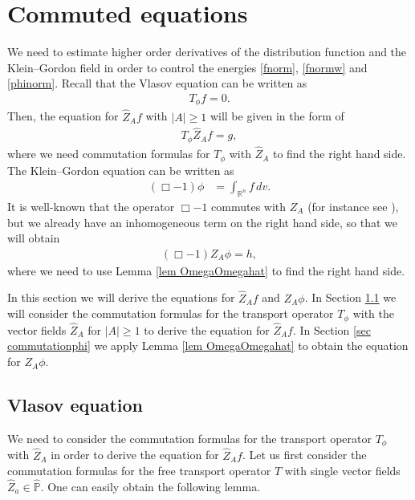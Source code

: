 \documentclass{article}
\newcommand{\bbr}{{\mathbb R}}
\newcommand{\bbp}{{\mathbb P}}
\newcommand{\bbrn}{{\bbr^n}}
\begin{document}
%
\section{Commuted equations} \label{sec commutation}
We need to estimate higher order derivatives of the distribution function and the Klein--Gordon field in order to control the energies \eqref{fnorm}, \eqref{fnormw} and \eqref{phinorm}. Recall that the Vlasov equation can be written as
\begin{align*}
T_\phi f = 0 .
\end{align*}
Then, the equation for $ \hat{ Z }_A f $ with $ | A | \geq 1 $ will be given in the form of
\begin{align*}
T_\phi \hat{ Z }_A f = g ,
\end{align*}
where we need commutation formulas for $ T_\phi $ with $ \hat{ Z }_A $ to find the right hand side. The Klein--Gordon equation can be written as
\begin{align*}
( \Box - 1 ) \phi & = \int_\bbrn f \, d v .
\end{align*}
It is well-known that the operator $ \Box - 1 $ commutes with $ Z_A $ (for instance see \cite{K85, K93}), but we already have an inhomogeneous term on the right hand side, so that we will obtain
\begin{align*}
( \Box - 1 ) Z_A \phi = h ,
\end{align*}
where we need to use Lemma \ref{lem OmegaOmegahat} to find the right hand side.

In this section we will derive the equations for $ \hat{ Z }_A f $ and $ Z_A \phi $. In Section \ref{sec commutationf} we will consider the commutation formulas for the transport operator $ T_\phi $ with the vector fields $ \hat{ Z }_A $ for $ | A | \geq 1 $ to derive the equation for $ \hat{ Z }_A f $. In Section \ref{sec commutationphi} we apply Lemma \ref{lem OmegaOmegahat} to obtain the equation for $ Z_A \phi $.

%
\subsection{Vlasov equation} \label{sec commutationf}
We need to consider the commutation formulas for the transport operator $ T_\phi $ with $ \hat{ Z }_A $ in order to derive the equation for $ \hat{ Z }_A f $. Let us first consider the commutation formulas for the free transport operator $ T $ with single vector fields $ \hat{ Z }_a \in \hat{ \bbp } $. One can easily obtain the following lemma.
\end{document}
